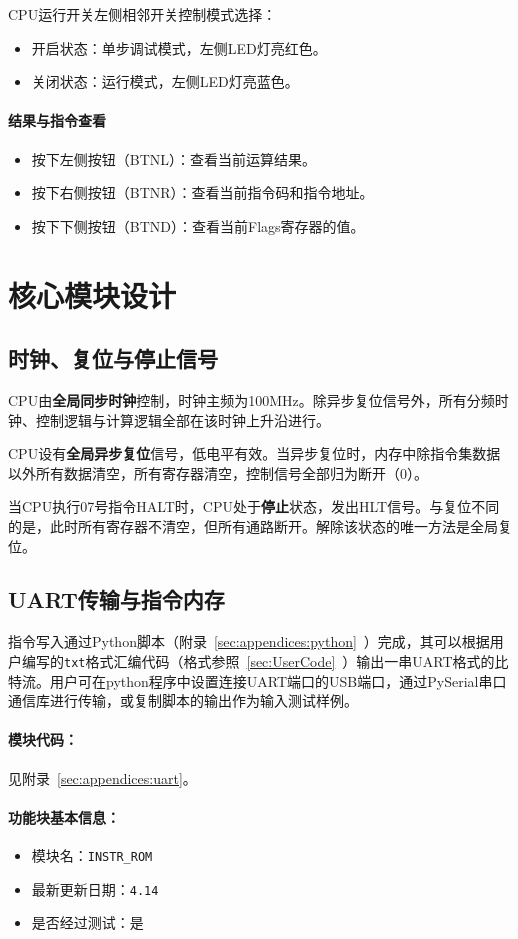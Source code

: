 \documentclass[lang=cn,a4paper,newtx]{elegantpaper}
\begin{document}
CPU运行开关左侧相邻开关控制模式选择：
\begin{itemize}
  \item 开启状态：单步调试模式，左侧LED灯亮红色。
  \item 关闭状态：运行模式，左侧LED灯亮蓝色。
\end{itemize}

\paragraph{结果与指令查看}

\begin{itemize}
  \item 按下左侧按钮（BTNL）：查看当前运算结果。
  \item 按下右侧按钮（BTNR）：查看当前指令码和指令地址。
  \item 按下下侧按钮（BTND）：查看当前Flags寄存器的值。
\end{itemize}
\section{核心模块设计}
\subsection{时钟、复位与停止信号}
CPU由\textbf{全局同步时钟}控制，时钟主频为100MHz。除异步复位信号外，所有分频时钟、控制逻辑与计算逻辑全部在该时钟上升沿进行。

CPU设有\textbf{全局异步复位}信号，低电平有效。当异步复位时，内存中除指令集数据以外所有数据清空，所有寄存器清空，控制信号全部归为断开（0）。

当CPU执行07号指令HALT时，CPU处于\textbf{停止}状态，发出HLT信号。与复位不同的是，此时所有寄存器不清空，但所有通路断开。解除该状态的唯一方法是全局复位。

\subsection{UART传输与指令内存}
指令写入通过Python脚本（附录~\ref{sec:appendices:python}~）完成，其可以根据用户编写的\texttt{txt}格式汇编代码（格式参照~\ref{sec:UserCode}~）输出一串UART格式的比特流。用户可在python程序中设置连接UART端口的USB端口，通过PySerial串口通信库进行传输，或复制脚本的输出作为输入测试样例。
\paragraph{模块代码：}
见附录~\ref{sec:appendices:uart}。
\paragraph{功能块基本信息：}
\begin{itemize}
  \item 模块名：\texttt{INSTR\_ROM}
  \item 最新更新日期：\texttt{4.14}
  \item 是否经过测试：是
\end{itemize}
\end{document}
